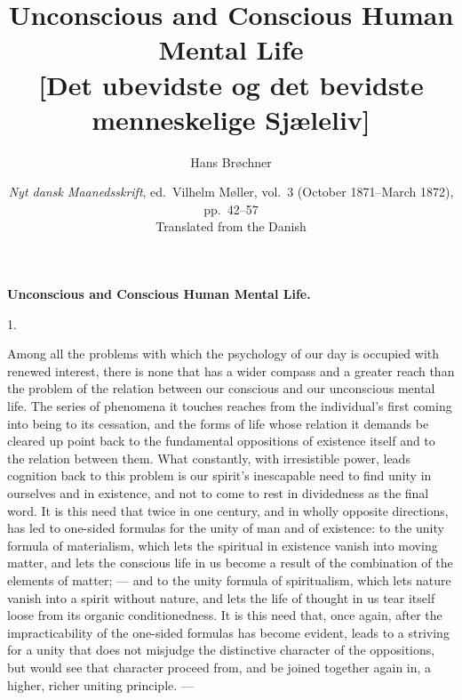 \documentclass[12pt,a4paper,openany]{book}
\title{\textbf{Unconscious and Conscious Human Mental Life}\\[8pt]
  \large [Det ubevidste og det bevidste menneskelige Sjæleliv]}
\author{Hans Brøchner}
\date{\textit{Nyt dansk Maanedsskrift}, ed.\ Vilhelm Møller, vol.~3
  (October 1871--March 1872), pp.~42--57\\[10pt]
  \small Translated from the Danish}
\newcommand{\secnum}[1]{\par\begin{center}#1\end{center}\par\nobreak}
\newcommand{\opage}[1]{\marginnote{\footnotesize\textit{[#1]}}}
\begin{document}
\maketitle
\thispagestyle{empty}
\clearpage

\opage{42}\begin{center}\textbf{\large Unconscious and Conscious Human Mental Life.}\end{center}

\secnum{1.}

Among all the problems with which the psychology of our
day is occupied with renewed interest, there is none that has a
wider compass and a greater reach than the problem of the relation
between our conscious and our unconscious mental life.
The series of phenomena it touches reaches from the individual's
first coming into being to its cessation, and the forms of life
whose relation it demands be cleared up point back to the
fundamental oppositions of existence itself and to the relation between them.
What constantly, with irresistible power, leads cognition back
to this problem is our spirit's inescapable need to find unity
in ourselves and in existence, and not to come to rest in dividedness
as the final word. It is this need that twice in one century, and in
wholly opposite directions, has led to one-sided formulas for the
unity of man and of existence: to the unity formula of materialism,
which lets the spiritual in existence vanish into moving matter,
and lets the conscious life in us become a result of the combination
of the elements of matter; --- and to the unity formula of spiritualism,
which lets nature vanish into a spirit without nature, and lets the
life of thought in us tear itself loose from its organic conditionedness.
It is this need that, once again, after the impracticability of the
one-sided formulas has become evident, leads to
\opage{43}a striving for a unity that does not misjudge the distinctive character
of the oppositions, but would see that character proceed from, and be
joined together again in, a higher, richer uniting principle. ---
\end{document}
